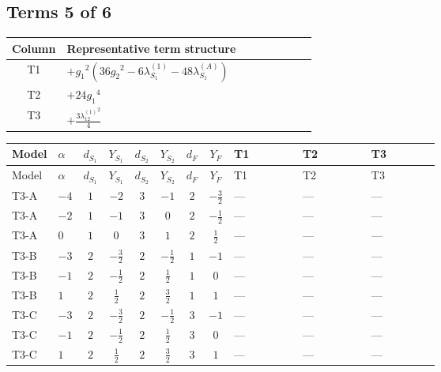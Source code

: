 \documentclass[8pt]{article}
\begin{document}
\begin{landscape}
\subsection*{Terms 5 of 6}
\begin{center}
\begin{tabular}{@{}c >{\raggedright\arraybackslash}p{0.82\linewidth}@{}}
\toprule
Column & Representative term structure \\
\midrule
T1 & \(\displaystyle +{g_1}^2 \left(36 {g_2}^2-6 {\lambda_{S_1}^{(1)}}-48 {\lambda_{S_1}^{(A)}}\right)\) \\
\midrule
T2 & \(\displaystyle +24 {g_1}^4\) \\
\midrule
T3 & \(\displaystyle +\frac{3 {\lambda_{12}^{(1)}}^2}{4}\) \\
\midrule
\bottomrule
\end{tabular}
\end{center}
\smallskip
\tiny
\begin{longtable}{@{}llcccccc >{\raggedright\arraybackslash}p{0.21\linewidth} >{\raggedright\arraybackslash}p{0.21\linewidth} >{\raggedright\arraybackslash}p{0.21\linewidth}@{}}
\toprule
Model & $\alpha$ & $d_{S_1}$ & $Y_{S_1}$ & $d_{S_2}$ & $Y_{S_2}$ & $d_F$ & $Y_F$ & T1 & T2 & T3 \\
\midrule
\endfirsthead
\toprule
Model & $\alpha$ & $d_{S_1}$ & $Y_{S_1}$ & $d_{S_2}$ & $Y_{S_2}$ & $d_F$ & $Y_F$ & T1 & T2 & T3 \\
\midrule
\endhead
T3-A & $-4$ & $1$ & $-2$ & $3$ & $-1$ & $2$ & $-\frac{3}{2}$ & --- & --- & --- \\
\midrule
T3-A & $-2$ & $1$ & $-1$ & $3$ & $0$ & $2$ & $-\frac{1}{2}$ & --- & --- & --- \\
\midrule
T3-A & $0$ & $1$ & $0$ & $3$ & $1$ & $2$ & $\frac{1}{2}$ & --- & --- & --- \\
\midrule
T3-B & $-3$ & $2$ & $-\frac{3}{2}$ & $2$ & $-\frac{1}{2}$ & $1$ & $-1$ & --- & --- & --- \\
\midrule
T3-B & $-1$ & $2$ & $-\frac{1}{2}$ & $2$ & $\frac{1}{2}$ & $1$ & $0$ & --- & --- & --- \\
\midrule
T3-B & $1$ & $2$ & $\frac{1}{2}$ & $2$ & $\frac{3}{2}$ & $1$ & $1$ & --- & --- & --- \\
\midrule
T3-C & $-3$ & $2$ & $-\frac{3}{2}$ & $2$ & $-\frac{1}{2}$ & $3$ & $-1$ & --- & --- & --- \\
\midrule
T3-C & $-1$ & $2$ & $-\frac{1}{2}$ & $2$ & $\frac{1}{2}$ & $3$ & $0$ & --- & --- & --- \\
\midrule
T3-C & $1$ & $2$ & $\frac{1}{2}$ & $2$ & $\frac{3}{2}$ & $3$ & $1$ & --- & --- & --- \\

\end{longtable}
\end{landscape}
\end{document}

